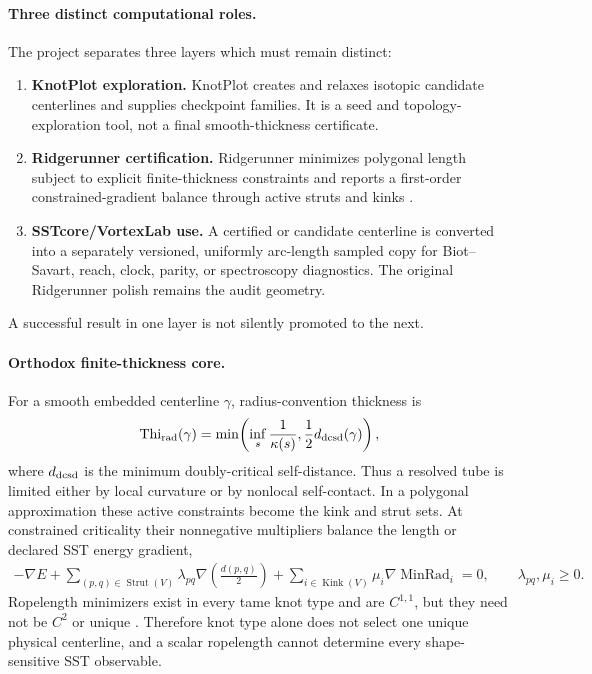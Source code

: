 \documentclass[11pt]{article}
\theoremstyle{definition}
\theoremstyle{plain}
\theoremstyle{remark}
\begin{document}
\paragraph{Three distinct computational roles.}
The project separates three layers which must remain distinct:
\begin{enumerate}
    \item \textbf{KnotPlot exploration.} KnotPlot creates and relaxes isotopic
    candidate centerlines and supplies checkpoint families.  It is a seed and
    topology-exploration tool, not a final smooth-thickness certificate.

    \item \textbf{Ridgerunner certification.} Ridgerunner minimizes polygonal
    length subject to explicit finite-thickness constraints and reports a
    first-order constrained-gradient balance through active struts and kinks
    \cite{AshtonCantarellaPiatekRawdon2011}.

    \item \textbf{SSTcore/VortexLab use.} A certified or candidate centerline is
    converted into a separately versioned, uniformly arc-length sampled copy
    for Biot--Savart, reach, clock, parity, or spectroscopy diagnostics.  The
    original Ridgerunner polish remains the audit geometry.
\end{enumerate}
A successful result in one layer is not silently promoted to the next.

\paragraph{Orthodox finite-thickness core.}
For a smooth embedded centerline $\gamma$, radius-convention thickness is
\begin{align}
    \operatorname{Thi}_{\rm rad}(\gamma)
    =
    \min\!\left(
        \inf_s\frac{1}{\kappa(s)},
        \frac12d_{\rm dcsd}(\gamma)
    \right),
    \label{eq:genesis_knotplot_thickness_split}
\end{align}
where $d_{\rm dcsd}$ is the minimum doubly-critical self-distance.  Thus a
resolved tube is limited either by local curvature or by nonlocal self-contact.
In a polygonal approximation these active constraints become the kink and
strut sets.  At constrained criticality their nonnegative multipliers balance
the length or declared SST energy gradient,
\begin{align}
    -\nabla E
    +
    \sum_{(p,q)\in\operatorname{Strut}(V)}
        \lambda_{pq}\nabla\!\left(\frac{d(p,q)}{2}\right)
    +
    \sum_{i\in\operatorname{Kink}(V)}
        \mu_i\nabla\operatorname{MinRad}_i
    =0,
    \qquad
    \lambda_{pq},\mu_i\ge0.
    \label{eq:genesis_knotplot_contact_balance}
\end{align}
Ropelength minimizers exist in every tame knot type and are $C^{1,1}$, but they
need not be $C^2$ or unique \cite{CantarellaKusnerSullivan2002}.  Therefore knot
type alone does not select one unique physical centerline, and a scalar
ropelength cannot determine every shape-sensitive SST observable.
\end{document}
